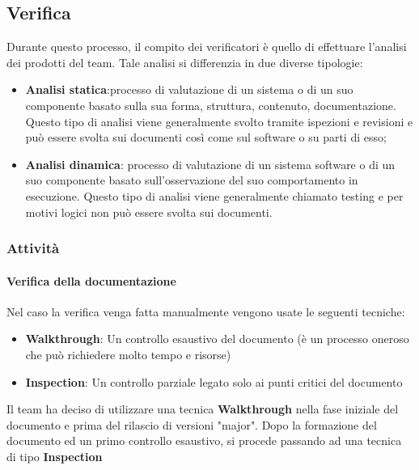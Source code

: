 \documentclass[12pt]{article}
\begin{document}
\label{Verifica}
\subsection{Verifica}
Durante questo processo, il compito dei verificatori è quello di effettuare l’analisi dei prodotti del team.
Tale analisi si differenzia in due diverse tipologie:
\begin{itemize}
    \item \textbf{Analisi statica}:processo di valutazione di un sistema o di un suo componente basato sulla sua
          forma, struttura, contenuto, documentazione. Questo tipo di analisi viene generalmente svolto
          tramite ispezioni e revisioni e può essere svolta sui documenti così come sul software o su parti
          di esso;

    \item \textbf{Analisi dinamica}: processo di valutazione di un sistema software o di un suo componente
          basato sull’osservazione del suo comportamento in esecuzione. Questo tipo di analisi viene
          generalmente chiamato testing e per motivi logici non può essere svolta sui documenti.
\end{itemize}

\subsubsection{Attività}
\paragraph{Verifica della documentazione}
\label{VerificaDocumento}
Nel caso la verifica venga fatta manualmente vengono usate le seguenti tecniche:
\begin{itemize}
    \item \textbf{Walkthrough}: Un controllo esaustivo del documento (è un processo oneroso che può richiedere molto tempo e risorse)
    \item \textbf{Inspection}: Un controllo parziale legato solo ai punti critici del documento
\end{itemize}
Il team ha deciso di utilizzare una tecnica \textbf{Walkthrough} nella fase iniziale del documento e prima del rilascio di versioni "major".
Dopo la formazione del documento ed un primo controllo esaustivo, si procede passando ad una tecnica di tipo \textbf{Inspection}
\end{document}
